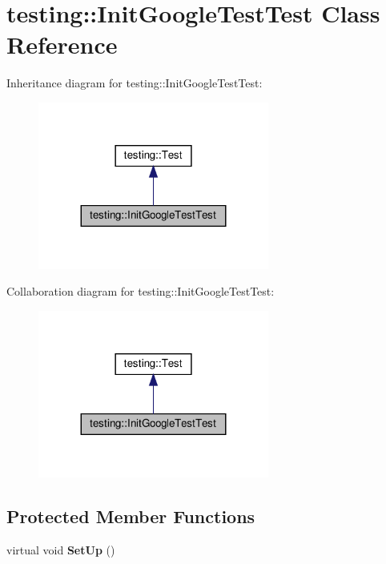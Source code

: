 \hypertarget{classtesting_1_1_init_google_test_test}{}\section{testing\+:\+:Init\+Google\+Test\+Test Class Reference}
\label{classtesting_1_1_init_google_test_test}


Inheritance diagram for testing\+:\+:Init\+Google\+Test\+Test\+:
\nopagebreak
\begin{figure}[H]
\begin{center}
\leavevmode
\includegraphics[width=215pt]{classtesting_1_1_init_google_test_test__inherit__graph}
\end{center}
\end{figure}


Collaboration diagram for testing\+:\+:Init\+Google\+Test\+Test\+:
\nopagebreak
\begin{figure}[H]
\begin{center}
\leavevmode
\includegraphics[width=215pt]{classtesting_1_1_init_google_test_test__coll__graph}
\end{center}
\end{figure}
\subsection*{Protected Member Functions}
\begin{DoxyCompactItemize}
\item 
\mbox{\label{classtesting_1_1_init_google_test_test_a49de9e552ea788c4b79924ec4135ca7a}} 
virtual void {\bfseries Set\+Up} ()
\end{DoxyCompactItemize}
